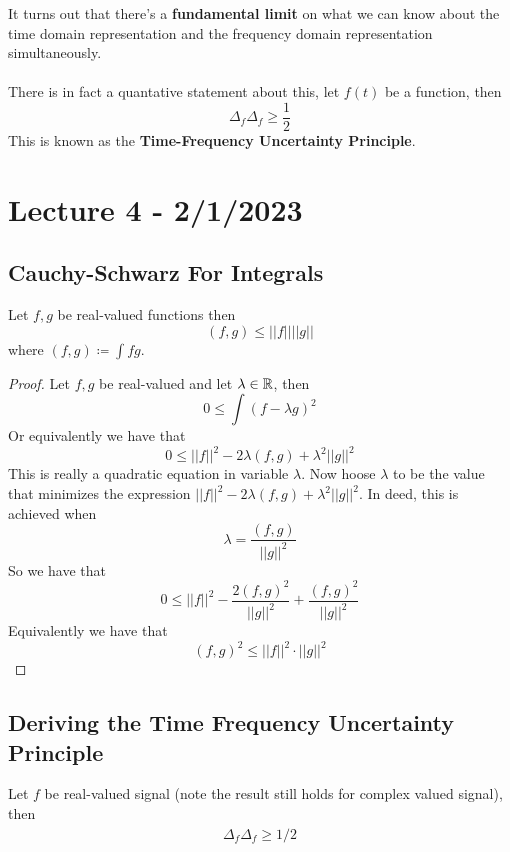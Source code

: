 \documentclass{article}
\begin{document}
\begin{remark}
    It turns out that there's a \textbf{fundamental limit} on what we can know about the time domain representation and the frequency domain representation simultaneously.\\\\
    There is in fact a quantative statement about this, let $f(t)$ be a function, then
    \[\Delta_f \hat{\Delta}_f \geq \frac{1}{2}\]
    This is known as the \textbf{Time-Frequency Uncertainty Principle}.
\end{remark}

\newpage
\section{Lecture 4 - 2/1/2023}

\subsection{Cauchy-Schwarz For Integrals}

\begin{theorem}
Let $f, g$ be real-valued functions then
\[(f, g) \leq ||f|| ||g||\]
where $(f, g) \coloneqq \int f g$.
\end{theorem}

\begin{proof}
Let $f, g$ be real-valued and let $\lambda \in \mathbb{R}$, then
\[0 \leq \int (f - \lambda g)^2\]
Or equivalently we have that
\[0 \leq ||f||^2 - 2 \lambda (f, g) + \lambda^2 ||g||^2\]
This is really a quadratic equation in variable $\lambda$. Now hoose $\lambda$ to be the value that minimizes the expression $||f||^2 - 2 \lambda (f, g) + \lambda^2 ||g||^2$. In deed, this is achieved when
    \[\lambda = \frac{(f, g)}{||g||^2}\]
    So we have that
    \[0 \leq ||f||^2 - \frac{2 (f, g)^2}{||g||^2} + \frac{(f, g)^2}{||g||^2}\]
    Equivalently we have that
    \[(f, g)^2 \leq ||f||^2 \cdot ||g||^2\]
\end{proof}

\subsection{Deriving the Time Frequency Uncertainty Principle}

\begin{theorem}
Let $f$ be real-valued signal (note the result still holds for complex valued signal), then
\[\Delta_f \widehat{\Delta}_f \geq 1/2\]    
\end{theorem}
\end{document}
